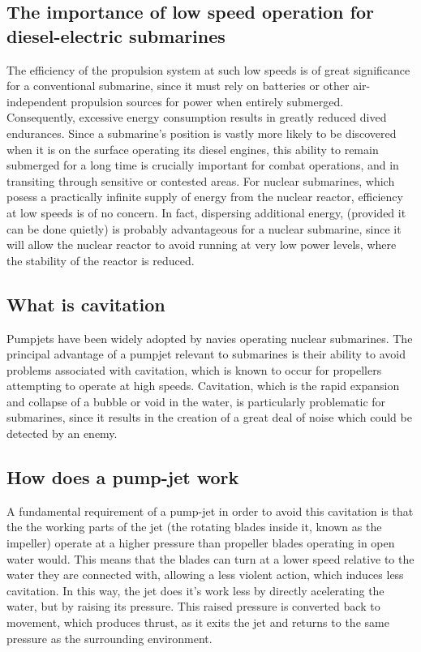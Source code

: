 \documentclass{article}\usepackage[]{graphicx}\usepackage[]{color}
\begin{document}
\subsection{The importance of low speed operation for diesel-electric submarines}

The efficiency of the propulsion system at such low speeds is of great significance for a conventional submarine, since it must rely on batteries or other air-independent propulsion sources for power when entirely submerged.  Consequently, excessive energy consumption results in greatly reduced dived endurances.  Since a submarine's position is vastly more likely to be discovered when it is on the surface operating its diesel engines, this ability to remain submerged for a long time is crucially important for combat operations, and in transiting through sensitive or contested areas.  For nuclear submarines, which posess a practically infinite supply of energy from the nuclear reactor, efficiency at low speeds is of no concern.  In fact, dispersing additional energy, (provided it can be done quietly) is probably advantageous for a nuclear submarine, since it will allow the nuclear reactor to avoid running at very low power levels, where the stability of the reactor is reduced.

\subsection{What is cavitation}

Pumpjets have been widely adopted by navies operating nuclear submarines.  The principal advantage of a pumpjet relevant to submarines is their ability to avoid problems associated with cavitation, which is known to occur for propellers attempting to operate at high speeds.  Cavitation, which is the rapid expansion and collapse of a bubble or void in the water, is particularly problematic for submarines, since it results in the creation of a great deal of noise which could be detected by an enemy.

\subsection{How does a pump-jet work}

A fundamental requirement of a pump-jet in order to avoid this cavitation is that the the working parts of the jet (the rotating blades inside it, known as the impeller) operate at a higher pressure than propeller blades operating in open water would.  This means that the blades can turn at a lower speed relative to the water they are connected with, allowing a less violent action, which induces less cavitation.  In this way, the jet does it's work less by directly acelerating the water, but by raising its pressure.  This raised pressure is converted back to movement, which produces thrust, as it exits the jet and returns to the same pressure as the surrounding environment.
\end{document}
